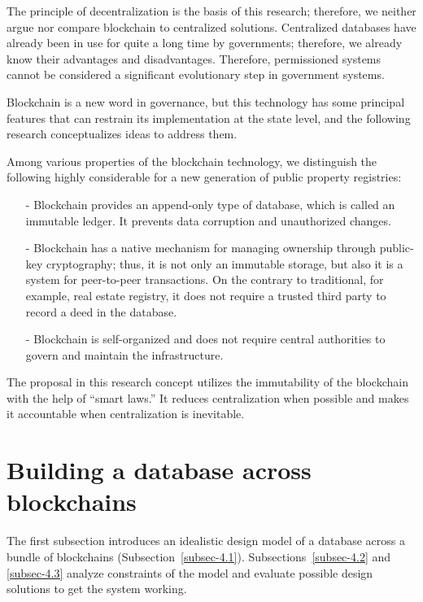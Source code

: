 \begin{multicols}{2}
The principle of decentralization is the basis of this research; therefore, we neither argue nor compare blockchain to centralized solutions. Centralized databases have already been in use for quite a long time by governments; therefore, we already know their advantages and disadvantages. Therefore, permissioned systems cannot be considered a significant evolutionary step in government systems.

Blockchain is a new word in governance, but this technology has some principal features that can restrain its implementation at the state level, and the following research conceptualizes ideas to address them.

Among various properties of the blockchain technology, we distinguish the following highly considerable for a new generation of public property registries:

\vspace{-.4cm}

\begin{itemize}
\item[-] Blockchain provides an append-only type of database, which is called an immutable ledger. It prevents data corruption and unauthorized changes.
\item[-] Blockchain has a native mechanism for managing ownership through public-key cryptography; thus, it is not only an immutable storage, but also it is a system for peer-to-peer transactions. On the contrary to traditional, for example, real estate registry, it does not require a trusted third party to record a deed in the database.
\item[-] Blockchain is self-organized and does not require central authorities to govern and maintain the infrastructure.
\end{itemize}

The proposal in this research concept utilizes the immutability of the blockchain with the help of “smart laws.” It reduces centralization when possible and makes it accountable when centralization is inevitable.

\section{Building a database across\\ blockchains}\label{sec-4}

The first subsection introduces an idealistic design model of a database across a bundle of blockchains (Subsection~\ref{subsec-4.1}). Subsections~\ref{subsec-4.2} and \ref{subsec-4.3} analyze constraints of the model and evaluate possible design solutions to get the system working.


\end{multicols}
